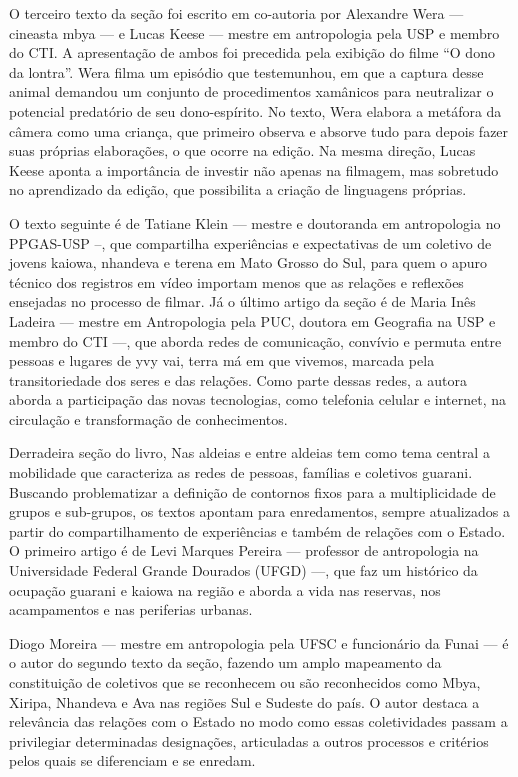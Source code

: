 \documentclass{article}
\begin{document}
O terceiro texto da se\c{c}\~ao foi escrito em co-autoria por Alexandre
Wera --- cineasta mbya --- e Lucas Keese --- mestre em antropologia
pela USP e membro do CTI. A apresenta\c{c}\~ao de ambos foi precedida
pela exibi\c{c}\~ao do filme {\textquotedblleft}O dono da
lontra{\textquotedblright}. Wera filma um epis\'odio que testemunhou,
em que a captura desse animal demandou um conjunto de procedimentos
xam\^anicos para neutralizar o potencial predat\'orio de seu
dono-esp\'irito. No texto, Wera elabora a met\'afora da c\^amera como
uma crian\c{c}a, que primeiro observa e absorve tudo para depois fazer
suas pr\'oprias elabora\c{c}\~oes, o que ocorre na edi\c{c}\~ao. Na
mesma dire\c{c}\~ao, Lucas Keese aponta a import\^ancia de investir
n\~ao apenas na filmagem, mas sobretudo no aprendizado da edi\c{c}\~ao,
que possibilita a cria\c{c}\~ao de linguagens pr\'oprias. 

O texto seguinte \'e de Tatiane Klein --- mestre e doutoranda em
antropologia no PPGAS-USP --, que compartilha experi\^encias e
expectativas de um coletivo de jovens kaiowa, nhandeva e terena em Mato
Grosso do Sul, para quem o apuro t\'ecnico dos registros em v\'ideo
importam menos que as rela\c{c}\~oes e reflex\~oes ensejadas no
processo de filmar. J\'a o \'ultimo artigo da se\c{c}\~ao \'e de Maria
In\^es Ladeira --- mestre em Antropologia pela PUC, doutora em
Geografia na USP e membro do CTI ---, que aborda redes de
comunica\c{c}\~ao, conv\'ivio e permuta entre pessoas e lugares de yvy
vai, terra m\'a em que vivemos, marcada pela transitoriedade dos seres
e das rela\c{c}\~oes. Como parte dessas redes, a autora aborda a
participa\c{c}\~ao das novas tecnologias, como telefonia celular e
internet, na circula\c{c}\~ao e transforma\c{c}\~ao de conhecimentos.

Derradeira se\c{c}\~ao do livro, Nas aldeias e entre aldeias tem como
tema central a mobilidade que caracteriza as redes de pessoas,
fam\'ilias e coletivos guarani. Buscando problematizar a
defini\c{c}\~ao de contornos fixos para a multiplicidade de grupos e
sub-grupos, os textos apontam para enredamentos, sempre atualizados a
partir do compartilhamento de experi\^encias e tamb\'em de
rela\c{c}\~oes com o Estado. O primeiro artigo \'e de Levi Marques
Pereira --- professor de antropologia na Universidade Federal Grande
Dourados (UFGD) ---, que faz um hist\'orico da ocupa\c{c}\~ao guarani e
kaiowa na regi\~ao e aborda a vida nas reservas, nos acampamentos e nas
periferias urbanas. 

Diogo Moreira --- mestre em antropologia pela UFSC e funcion\'ario da
Funai --- \'e o autor do segundo texto da se\c{c}\~ao, fazendo um amplo
mapeamento da constitui\c{c}\~ao de coletivos que se reconhecem ou
s\~ao reconhecidos como Mbya, Xiripa, Nhandeva e Ava nas regi\~oes Sul
e Sudeste do pa\'is. O autor destaca a relev\^ancia das rela\c{c}\~oes
com o Estado no modo como essas coletividades passam a privilegiar
determinadas designa\c{c}\~oes, articuladas a outros processos e
crit\'erios pelos quais se diferenciam e se enredam. 
\end{document}
